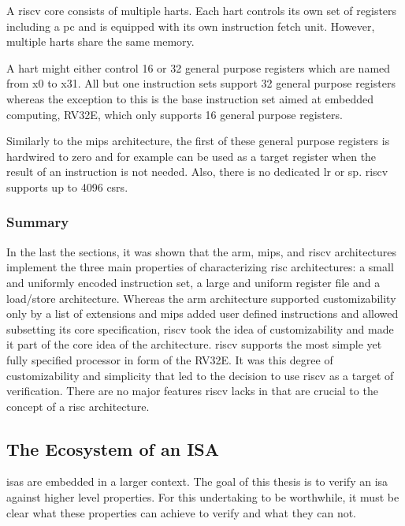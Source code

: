 A \gls{riscv} core consists of multiple \glspl{hart}.
Each \gls{hart} controls its own set of registers including a \gls{pc} and is equipped with its own instruction fetch unit.
However, multiple \glspl{hart} share the same memory.

A \gls{hart} might either control 16 or 32 general purpose registers which are named from x0 to x31.
All but one instruction sets support 32 general purpose registers whereas the exception to this is the base instruction set aimed at embedded computing, RV32E, which only supports 16 general purpose registers.

Similarly to the \gls{mips} architecture, the first of these general purpose registers is hardwired to zero and for example can be used as a target register when the result of an instruction is not needed.
Also, there is no dedicated \gls{lr} or \gls{sp}.
\gls{riscv} supports up to 4096 \glspl{csr}.

\subsubsection{Summary}

In the last the sections, it was shown that the \gls{arm}, \gls{mips}, and \gls{riscv} architectures implement the three main properties of \cite{Hennessy12} characterizing \gls{risc} architectures: a small and uniformly encoded instruction set, a large and uniform register file and a load/store architecture.
Whereas the \gls{arm} architecture supported customizability only by a list of extensions and \gls{mips} added user defined instructions and allowed subsetting its core specification, \gls{riscv} took the idea of customizability and made it part of the core idea of the architecture.
\gls{riscv} supports the most simple yet fully specified processor in form of the RV32E.
It was this degree of customizability and simplicity that led to the decision to use \gls{riscv} as a target of verification.
There are no major features \gls{riscv} lacks in that are crucial to the concept of a \gls{risc} architecture.

\subsection{The Ecosystem of an ISA}
\label{sec:ecosystem}

\glspl{isa} are embedded in a larger context.
The goal of this thesis is to verify an \gls{isa} against higher level properties.
For this undertaking to be worthwhile, it must be clear what these properties can achieve to verify and what they can not.

